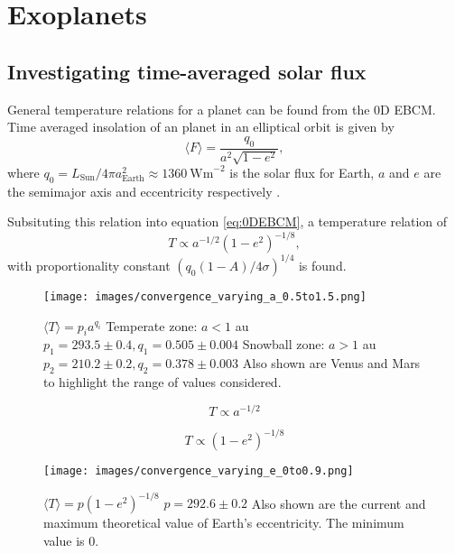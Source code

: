 \documentclass[12pt, onecolumn]{revtex4-2}    %
\begin{document}
\section{Exoplanets} \label{sec:Exoplanets}
\subsection{Investigating time-averaged solar flux} \label{ssec:InvTimeAveragedSolarFlux}
General temperature relations for a planet can be found from the 0D EBCM.
Time averaged insolation of an planet in an elliptical orbit is given by
\begin{equation}
  \langle F \rangle = \frac{q_0}{a^2 \sqrt{1-e^2}} \label{eq:avgInsolation},
\end{equation}
where $q_0 = L_{\text{Sun}}/4\pi a_{\text{Earth}}^2 \approx 1360 \ \text{Wm}^{-2}$ is the solar flux for Earth, $a$ and $e$ are the semimajor axis and eccentricity respectively \cite{Mendez2017}.

Subsituting this relation into equation \eqref{eq:0DEBCM}, a temperature relation of
\begin{equation}
  T \propto a^{-1/2} (1-e^2)^{-1/8}, \label{eq:T_propto_a_e}
\end{equation}
with proportionality constant $(q_0 (1-A) / 4\sigma)^{1/4}$ is found.

\begin{figure}
  \texttt{[image: images/convergence\_varying\_a\_0.5to1.5.png]}
  \caption{
    $\langle T \rangle = p_i a^{q_i}$
    Temperate zone: $a < 1$ au
    $p_1 = 293.5 \pm 0.4, q_1 = 0.505 \pm 0.004$
    Snowball zone: $a > 1$ au
    $p_2 = 210.2 \pm 0.2, q_2 = 0.378 \pm 0.003$
    Also shown are Venus and Mars to highlight the range of values considered.
  }
  \label{fig:planet_semimajoraxis}
\end{figure}
\begin{equation}
  T \propto a^{-1/2} \label{eq:T_propto_a}
\end{equation}

\begin{equation}
  T \propto (1-e^2)^{-1/8} \label{eq:T_propto_e}
\end{equation}
\begin{figure}
  \texttt{[image: images/convergence\_varying\_e\_0to0.9.png]}
  \caption{
    $\langle T \rangle = p(1-e^2)^{-1/8}$
    $p = 292.6 \pm 0.2$
    Also shown are the current and maximum theoretical value of Earth's eccentricity.
    The minimum value is $0$.
  }
  \label{fig:planet_eccentricity}
\end{figure}
\end{document}
